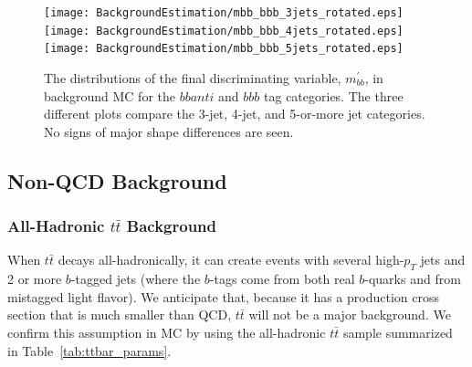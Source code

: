 \begin{figure}[hbt]
\texttt{[image: BackgroundEstimation/mbb\_bbb\_3jets\_rotated.eps]}
\texttt{[image: BackgroundEstimation/mbb\_bbb\_4jets\_rotated.eps]}\\
\texttt{[image: BackgroundEstimation/mbb\_bbb\_5jets\_rotated.eps]}
\caption{The distributions of the final discriminating variable, $m_{bb}^{'}$, 
in background MC for the $bbanti$ and $bbb$ tag categories.  The three different plots
compare the 3-jet, 4-jet, and 5-or-more jet categories.  No signs of major shape
differences are seen.
\label{fig:bkg_shape_compare}}
\end{figure}




 







\subsection{Non-QCD Background}
\label{sec:non_qcd_bkgs}

\subsubsection{All-Hadronic $t\bar{t}$ Background}
When $t\bar{t}$ decays all-hadronically, it can create events with several high-$p_T$
jets and 2 or more $b$-tagged jets (where the $b$-tags come from both real $b$-quarks
and from mistagged light flavor).  We anticipate that, because it has a production
cross section that is much smaller than QCD, $t\bar{t}$ will not be a major background.
We confirm this assumption in MC by using the all-hadronic $t\bar{t}$ sample summarized
in Table~\ref{tab:ttbar_params}.


